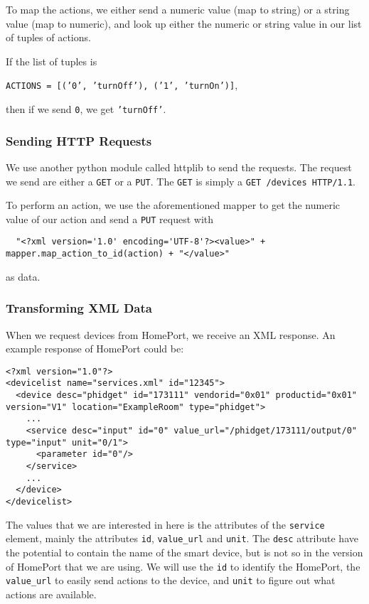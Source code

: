 To map the actions, we either send a numeric value (map to string) or a string value (map to numeric), 
and look up either the numeric or string value in our list of tuples of actions. 

If the list of tuples is
\begin{center}
  \texttt{ACTIONS = [('0', 'turnOff'), ('1', 'turnOn')]},
\end{center}
then if we send \texttt{0}, we get \texttt{'turnOff'}. 

\subsubsection{Sending HTTP Requests}
We use another python module called httplib to send the requests. 
The request we send are either a \texttt{GET} or a \texttt{PUT}. 
The \texttt{GET} is simply a \texttt{GET /devices HTTP/1.1}. 

To perform an action, we use the aforementioned mapper to get the numeric value of our action and send a \texttt{PUT} request with 
  \begin{verbatim}
  "<?xml version='1.0' encoding='UTF-8'?><value>" + mapper.map_action_to_id(action) + "</value>"
  \end{verbatim}
as data. 

\subsubsection{Transforming XML Data}
When we request devices from HomePort, 
we receive an XML response. 
An example response of HomePort could be:
\begin{verbatim}
<?xml version="1.0"?>
<devicelist name="services.xml" id="12345">
  <device desc="phidget" id="173111" vendorid="0x01" productid="0x01" version="V1" location="ExampleRoom" type="phidget">
    ...
    <service desc="input" id="0" value_url="/phidget/173111/output/0" type="input" unit="0/1">
      <parameter id="0"/>
    </service>
    ...
  </device>
</devicelist>
\end{verbatim}

The values that we are interested in here is the attributes of the \texttt{service} element, 
mainly the attributes \texttt{id}, \texttt{value\_url} and \texttt{unit}. 
The \texttt{desc} attribute have the potential to contain the name of the smart device, 
but is not so in the version of HomePort that we are using. 
We will use the \texttt{id} to identify the HomePort, 
the \texttt{value\_url} to easily send actions to the device, 
and \texttt{unit} to figure out what actions are available. 

